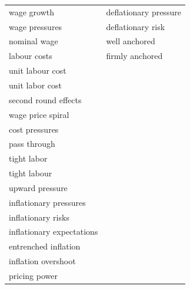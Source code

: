 \begin{longtable}{p{}p{}}
wage growth & deflationary pressure \\
wage pressures & deflationary risk \\
nominal wage & well anchored \\
labour costs & firmly anchored \\
unit labour cost &  \\
unit labor cost &  \\
second round effects &  \\
wage price spiral &  \\
cost pressures &  \\
pass through &  \\
tight labor &  \\
tight labour &  \\
upward pressure &  \\
inflationary pressures &  \\
inflationary risks &  \\
inflationary expectations &  \\
entrenched inflation &  \\
inflation overshoot &  \\
pricing power &  \\
\bottomrule
\end{longtable}

